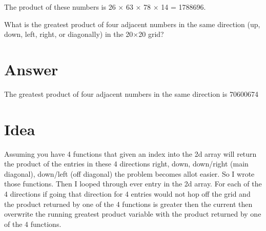 \documentclass{article}
\begin{document}
The product of these numbers is 26 × 63 × 78 × 14 = 1788696.

What is the greatest product of four adjacent numbers in the same direction (up, down, left, right, or diagonally) in the 20×20 grid?

\section*{Answer}
The greatest product of four adjacent numbers in the same direction is 70600674
\section*{Idea} Assuming you have 4 functions that given an index into the 2d array will return the product of the entries in these 4 directions right, down, down/right (main diagonal), down/left (off diagonal) the problem becomes allot easier. So I wrote those functions. Then I looped through ever entry in the 2d array. For each of the 4 directions if going that direction for 4 entries would not hop off the grid and the product returned by one of the 4 functions is greater then the current then overwrite the running greatest product variable with the product returned by one of the 4 functions. 
\end{document}
